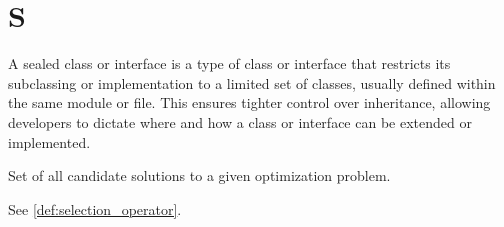 
\section*{S}
  \begin{definition}
  \label{def:sealed_class}
    A sealed class or interface is a type of class or interface that restricts 
    its subclassing or implementation to a limited set of classes, usually 
    defined within the same module or file.
    This ensures tighter control over inheritance, allowing developers to 
    dictate where and how a class or interface can be extended or implemented.
  \end{definition}

  \begin{definition}
  \label{def:search_space}
    Set of all candidate solutions to a given optimization problem.
  \end{definition}

  \begin{definition}[Selector]
    See \vref{def:selection_operator}.
  \end{definition}